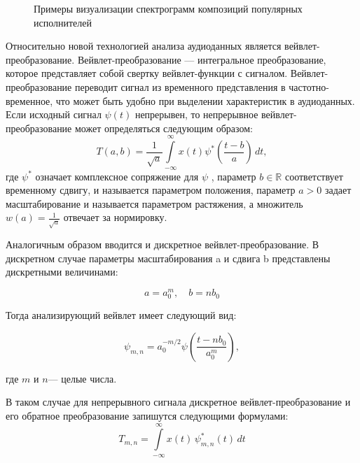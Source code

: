 \begin{figure}[H]
	\caption{Примеры визуализации спектрограмм композиций популярных исполнителей}
\end{figure}

Относительно новой технологией анализа аудиоданных является вейвлет-преобразование.
Вейвлет-преобразование — интегральное преобразование, которое представляет собой свертку вейвлет-функции с сигналом.
Вейвлет-преобразование переводит сигнал из временного представления в частотно-временное, что может быть удобно при выделении характеристик
в аудиоданных. Если исходный сигнал $\psi(t)$ непрерывен, то непрерывное вейвлет-преобразование может определяться
следующим образом:
\begin{equation}
	T(a,b)={\frac {1}{{\sqrt {a}}}}\int \limits _{{-\infty }}^{{\infty }}x(t)\psi ^{*}\left({\frac {t-b}{a}}\right)\,dt,
\end{equation} где
${\psi }^{*}$ означает комплексное сопряжение для $\psi$ , параметр $b\in \mathbb{R}$ соответствует временному сдвигу, 
и называется параметром положения, параметр $a > 0$ задает масштабирование и называется параметром растяжения, а множитель  $w(a) = \frac{1}{\sqrt{a}}$ отвечает за нормировку.

Аналогичным образом вводится и дискретное вейвлет-преобразование.
В дискретном случае параметры масштабирования a и сдвига b представлены дискретными величинами:

$$a=a_{0}^{m},\quad b=nb_{0}$$

Тогда анализирующий вейвлет имеет следующий вид:

\begin{equation}
	\psi _{{m,n}}=a_{0}^{{-m/2}}\psi \left({\frac {t-nb_{0}}{a_{0}^{m}}}\right),
\end{equation}

где $m$ и $n$— целые числа.

В таком случае для непрерывного сигнала дискретное вейвлет-преобразование и его обратное преобразование запишутся следующими формулами:
\begin{equation}
	T_{{m,n}}=\int \limits _{{-\infty }}^{{\infty }}x(t)\,\psi _{{m,n}}^{*}(t)\,dt
\end{equation}


